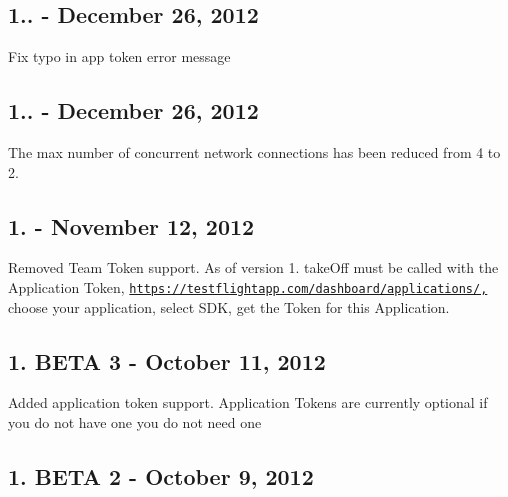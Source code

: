 \subsection*{1.. -\/ December 26, 2012}


\begin{DoxyItemize}
\item Fix typo in app token error message
\end{DoxyItemize}

\subsection*{1.. -\/ December 26, 2012}


\begin{DoxyItemize}
\item The max number of concurrent network connections has been reduced from 4 to 2.
\end{DoxyItemize}

\subsection*{1. -\/ November 12, 2012}


\begin{DoxyItemize}
\item Removed Team Token support. As of version 1. take\-Off must be called with the Application Token, \href{https://testflightapp.com/dashboard/applications/,}{\tt https\-://testflightapp.\-com/dashboard/applications/,} choose your application, select S\-D\-K, get the Token for this Application.
\end{DoxyItemize}

\subsection*{1. B\-E\-T\-A 3 -\/ October 11, 2012}


\begin{DoxyItemize}
\item Added application token support. Application Tokens are currently optional if you do not have one you do not need one
\end{DoxyItemize}

\subsection*{1. B\-E\-T\-A 2 -\/ October 9, 2012}



